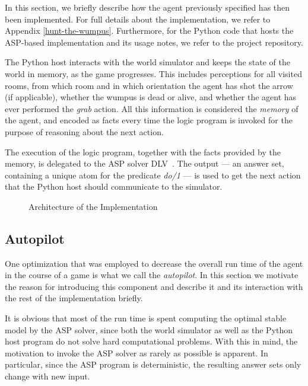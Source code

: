 \documentclass{llncs}
\begin{document}
In this section, we briefly describe how the agent previously specified has then been implemented.
For full details about the implementation, we refer to Appendix \ref{hunt-the-wumpus}.
Furthermore, for the Python code that hosts the ASP-based implementation and its usage notes, we refer to the project repository.

The Python host interacts with the world simulator and keeps the state of the world in memory, as the game progresses. This includes perceptions for all visited rooms, from which room and in which orientation the agent has shot the arrow (if applicable), whether the wumpus is dead or alive, and whether the agent has ever performed the \emph{grab} action. All this information is considered the \emph{memory} of the agent, and encoded as facts every time the logic program is invoked for the purpose of reasoning about the next action.

The execution of the logic program, together with the facts provided by the memory, is delegated to the ASP solver DLV~\cite{DLV-system}.
The output --- an answer set, containing a unique atom for the predicate \emph{do/1} --- is used to get the next action that the Python host should communicate to the simulator.

\begin{figure}
\begin{center}

\end{center}
\caption{Architecture of the Implementation}
\label{fig:architecture}
\end{figure}

\subsection{Autopilot}

One optimization that was employed to decrease the overall run time of the agent in the course of a game is what we call the \emph{autopilot}. In this section we motivate the reason for introducing this component and describe it and its interaction with the rest of the implementation briefly.

It is obvious that most of the run time is spent computing the optimal stable model by the ASP solver, since both the world simulator as well as the Python host program do not solve hard computational problems. With this in mind, the motivation to invoke the ASP solver as rarely as possible is apparent. In particular, since the ASP program is deterministic, the resulting answer sets only change with new input.
\end{document}
